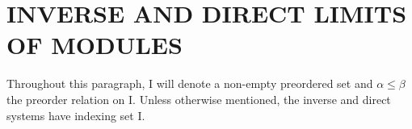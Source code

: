 \section{INVERSE AND DIRECT LIMITS OF MODULES}

Throughout this paragraph, I will denote a non-empty preordered set and \(\alpha \leqslant \beta\) the preorder relation on I. Unless otherwise mentioned, the inverse and direct systems have indexing set I.

